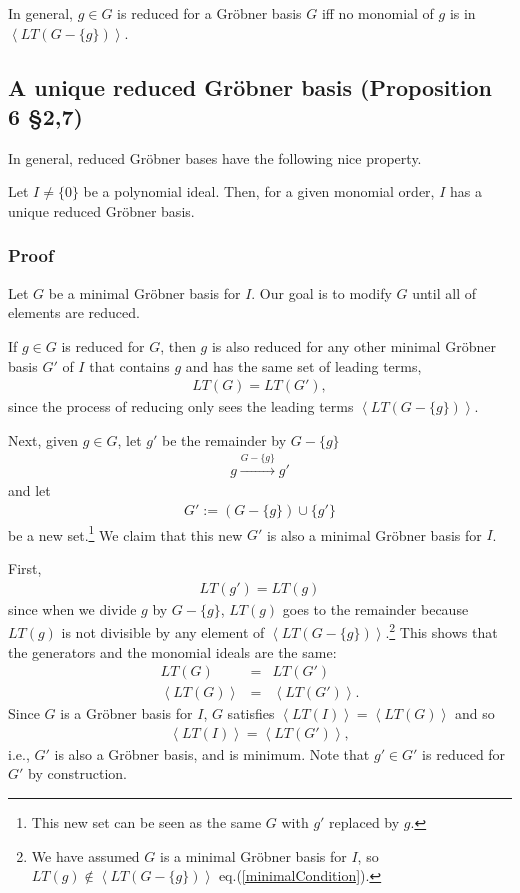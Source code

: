 \documentclass[11pt]{book}
\begin{document}
In general, $g \in G$ is reduced for a Gr\"obner basis $G$ iff no monomial of $g$ is in $\left< LT(G - \{g\}) \right>$.

\subsection{A unique reduced Gr\"obner basis (Proposition 6 \S2,7)}
\label{theUniquenessOfReducedGB}
In general, reduced Gr\"obner bases have the following nice property.

Let $I \neq \{0 \}$ be a polynomial ideal.
Then, for a given monomial order, $I$ has a unique reduced Gr\"obner basis.

\subsubsection{Proof}
Let $G$ be a minimal Gr\"obner basis for $I$.
Our goal is to modify $G$ until all of elements are reduced.

If $g \in G$ is reduced for $G$, then $g$ is also reduced for any other minimal Gr\"obner basis $G'$ of $I$ that contains $g$ and has the same set of leading terms, 
\begin{eqnarray}
LT(G) = LT(G'),
\end{eqnarray}
since the process of reducing only sees the leading terms $\left< LT(G - \{g\}) \right>$.

Next, given $g \in G$, let $g'$ be the remainder by $G - \{g\}$
\begin{eqnarray}
g \stackrel{G - \{g\}}{\to} g'
\end{eqnarray}
and let
\begin{eqnarray}
G' := (G-\{g\}) \cup \{g'\}
\end{eqnarray}
be a new set.\footnote{This new set can be seen as the same $G$ with $g'$ replaced by $g$.}
We claim that this new $G'$ is also a minimal Gr\"obner basis for $I$.

First,
\begin{eqnarray}
LT(g') = LT(g)
\end{eqnarray}
since when we divide $g$ by $G-\{g\}$, $LT(g)$ goes to the remainder because $LT(g)$ is not divisible by any element of $\left< LT(G - \{g\}) \right>$.\footnote{We have assumed $G$ is a minimal Gr\"obner basis for $I$, so $LT(g) \notin \left< LT(G - \{g\}) \right> $ eq.(\ref{minimalCondition}).}
This shows that the generators and the monomial ideals are the same:
\begin{eqnarray}
LT(G) &=& LT(G') \\
\left< LT(G) \right> &=& \left< LT(G') \right>.
\end{eqnarray}
Since $G$ is a Gr\"obner basis for $I$, $G$ satisfies $\left<LT(I)\right> = \left<LT(G) \right>$ and so
\begin{eqnarray}
\left<LT(I)\right> = \left<LT(G') \right>,
\end{eqnarray}
i.e., $G'$ is also a Gr\"obner basis, and is minimum.
Note that $g' \in G'$ is reduced for $G'$ by construction.
 
\end{document}
